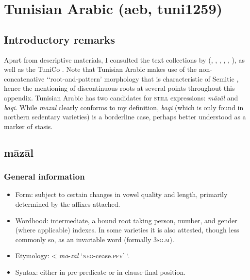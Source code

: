 \section{Tunisian Arabic (aeb, tuni1259)} 
\subsection{Introductory remarks}
\begin{sloppypar}
Apart from descriptive materials, I consulted the text collections by \citeauthor{RittBenmimoun2005Brot} (\citeyear*{RittBenmimoun2005Brot}, \citeyear*{RittBenmimoun2005Wiener}, \citeyear{RittBenmimoun20062010}, \citeyear{RittBenmimoun2007}, \citeyear*{RittBenmimoun2011Spiele}, \citeyear*{RittBenmimoun2011}), as well as the TuniCo \parencite{TuniCo}. Note that Tunisian Arabic makes use of the non-concatenative \lq\lq root-and-pattern\rq{ }morphology that is characteristic of Semitic \parencite{PatEl2019}, hence the mentioning of discontinuous roots at several points throughout this appendix. Tunisian Arabic has two candidates for \textsc{still} expressions: \textit{māzāl} and \textit{bāqi}. While \textit{māzāl} clearly conforms to my definition, \textit{bāqi} (which is only found in northern sedentary varieties) is a borderline case, perhaps better understood as a marker of stasis.
\end{sloppypar}

\subsection{māzāl}
\label{appendixTunisianMazal}
\subsubsection{General information}
\begin{itemize}
	\sloppy
	\item Form: subject to certain changes in vowel quality and length, primarily determined by the affixes attached.
	\item Wordhood: intermediate, a bound root taking person, number, and gender (where applicable) indexes. In some varieties it is also attested, though less commonly so, as an invariable word (formally 3\textsc{sg}.\textsc{m}).
	\item Etymology: < \textit{mā}-\textit{zāl} \lq \textsc{neg}-cease.\textsc{pfv}\rq{ }\lq{}.
	\item Syntax: either in pre-predicate or in clause-final position.
\end{itemize}


